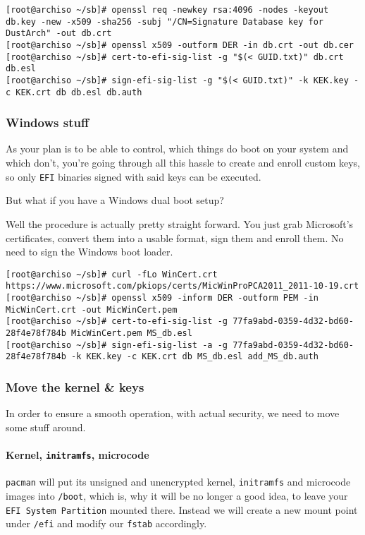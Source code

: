 \documentclass[9pt]{report}
\begin{document}
\begin{verbatim}
[root@archiso ~/sb]# openssl req -newkey rsa:4096 -nodes -keyout db.key -new -x509 -sha256 -subj "/CN=Signature Database key for DustArch" -out db.crt
[root@archiso ~/sb]# openssl x509 -outform DER -in db.crt -out db.cer
[root@archiso ~/sb]# cert-to-efi-sig-list -g "$(< GUID.txt)" db.crt db.esl
[root@archiso ~/sb]# sign-efi-sig-list -g "$(< GUID.txt)" -k KEK.key -c KEK.crt db db.esl db.auth
\end{verbatim}


\vfill\eject

\hypertarget{x-windows-stuff}{\subsubsection{Windows stuff}}
As your plan is to be able to control, which things do boot on your system and which don’t, you’re going through all this hassle to create and enroll custom keys, so only \texttt{EFI} binaries signed with said keys can be executed.


But what if you have a Windows dual boot setup?


Well the procedure is actually pretty straight forward.
You just grab Microsoft’s certificates, convert them into a usable format, sign them and enroll them.
No need to sign the Windows boot loader.


\begin{verbatim}
[root@archiso ~/sb]# curl -fLo WinCert.crt https://www.microsoft.com/pkiops/certs/MicWinProPCA2011_2011-10-19.crt
[root@archiso ~/sb]# openssl x509 -inform DER -outform PEM -in MicWinCert.crt -out MicWinCert.pem
[root@archiso ~/sb]# cert-to-efi-sig-list -g 77fa9abd-0359-4d32-bd60-28f4e78f784b MicWinCert.pem MS_db.esl
[root@archiso ~/sb]# sign-efi-sig-list -a -g 77fa9abd-0359-4d32-bd60-28f4e78f784b -k KEK.key -c KEK.crt db MS_db.esl add_MS_db.auth
\end{verbatim}


\vfill\eject

\hypertarget{x-move-the-kernel-and-keys}{\subsubsection{Move the kernel \& keys}}
In order to ensure a smooth operation, with actual security, we need to move some stuff around.



\vfill\eject

\hypertarget{x-kernel-initramfs-microcode}{\paragraph{Kernel, \texttt{initramfs}, microcode}}
\texttt{pacman} will put its unsigned and unencrypted kernel, \texttt{initramfs} and microcode images into \texttt{/boot}, which is, why it will be no longer a good idea, to leave your \texttt{EFI System Partition} mounted there.
Instead we will create a new mount point under \texttt{/efi} and modify our \texttt{fstab} accordingly.
\end{document}
